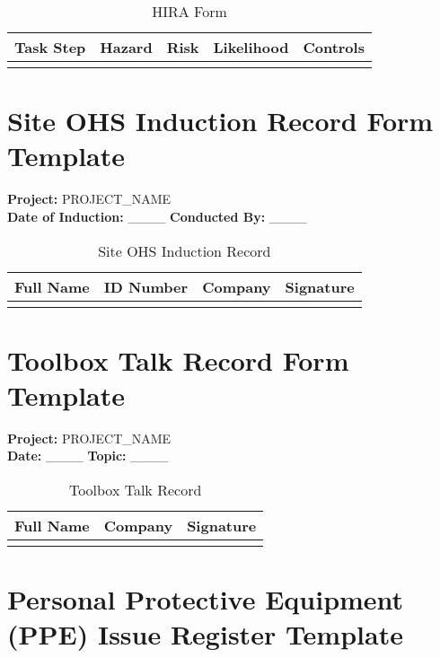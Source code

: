 \documentclass[12pt]{article}
\begin{document}
\begin{table}[h]
    \centering
    \begin{tabular}{p{2cm}p{3cm}p{3cm}p{3cm}p{3cm}}
        \toprule
        \textbf{Task Step} & \textbf{Hazard} & \textbf{Risk} & \textbf{Likelihood} & \textbf{Controls} \\
        \midrule
        & & & & \\
        \bottomrule
    \end{tabular}
    \caption{HIRA Form}
\end{table}

\section{Site OHS Induction Record Form Template}

\textbf{Project:} {{PROJECT_NAME}}\\
\textbf{Date of Induction:} \_\_\_\_ \textbf{Conducted By:} \_\_\_\_

\begin{table}[h]
    \centering
    \begin{tabular}{p{3cm}p{3cm}p{3cm}p{3cm}}
        \toprule
        \textbf{Full Name} & \textbf{ID Number} & \textbf{Company} & \textbf{Signature} \\
        \midrule
        & & & \\
        \bottomrule
    \end{tabular}
    \caption{Site OHS Induction Record}
\end{table}

\section{Toolbox Talk Record Form Template}

\textbf{Project:} {{PROJECT_NAME}}\\
\textbf{Date:} \_\_\_\_ \textbf{Topic:} \_\_\_\_

\begin{table}[h]
    \centering
    \begin{tabular}{p{3cm}p{3cm}p{3cm}}
        \toprule
        \textbf{Full Name} & \textbf{Company} & \textbf{Signature} \\
        \midrule
        & & & \\
        \bottomrule
    \end{tabular}
    \caption{Toolbox Talk Record}
\end{table}

\section{Personal Protective Equipment (PPE) Issue Register Template}
\end{document}
